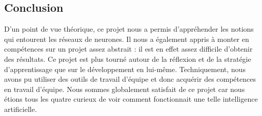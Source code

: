 \documentclass[12pt]{article}
\begin{document}
\subsection{Conclusion}
D'un point de vue théorique, ce projet nous a permis d'appréhender les notions qui entourent les réseaux de neurones. Il nous a également appris à monter en compétences sur un projet assez abstrait : il est en effet assez difficile d'obtenir des résultats. Ce projet est plus tourné autour de la réflexion et de la stratégie d'apprentissage que sur le développement en lui-même. 
Techniquement, nous avons pu utiliser des outils de travail d'équipe et donc acquérir des compétences en travail d'équipe. Nous sommes globalement satisfait de ce projet car nous étions tous les quatre curieux de voir comment fonctionnait une telle intelligence artificielle.
\end{document}
